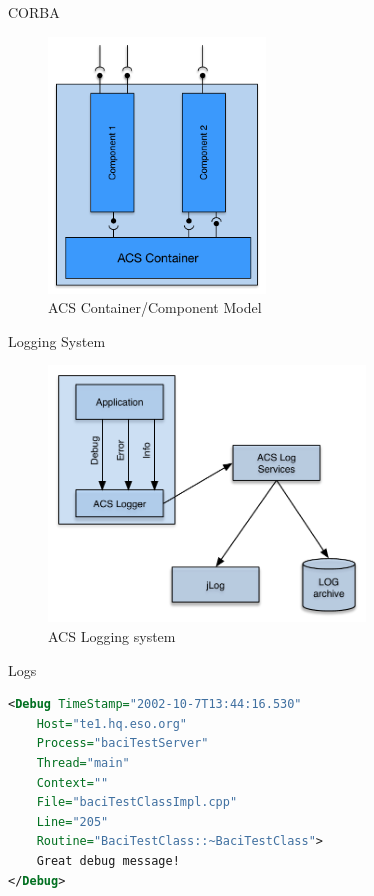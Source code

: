 \documentclass[11pt]{beamer}
\begin{document}
\begin{frame}{CORBA}
\begin{figure}
\centering
	\includegraphics[height=6.8cm]{container_component_corba}
\caption{ACS Container/Component Model}
\end{figure}
\end{frame}


\begin{frame}{Logging System}
\begin{figure}
\centering
	\includegraphics[height=6.8cm]{acs-logging-system}
\caption{ACS Logging system}
\end{figure}
\end{frame}


\begin{frame}[fragile]{Logs}
\begin{lstlisting}[caption=Ejemplo un evento XML de log, language=XML]
<Debug TimeStamp="2002-10-7T13:44:16.530"
	Host="te1.hq.eso.org"
	Process="baciTestServer"
	Thread="main"
	Context=""
	File="baciTestClassImpl.cpp"
	Line="205"
	Routine="BaciTestClass::~BaciTestClass">
    Great debug message!
</Debug>
\end{lstlisting}
	
\end{frame}
\end{document}
